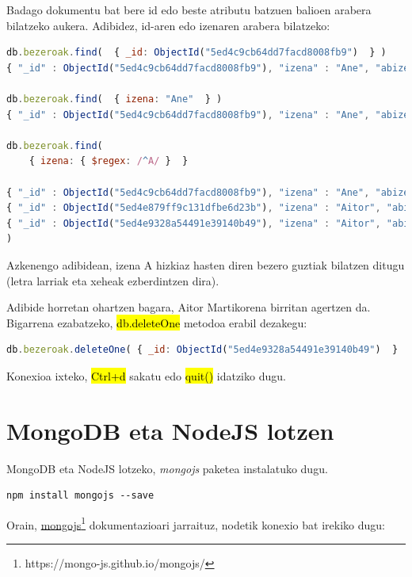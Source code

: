Badago dokumentu bat bere id edo beste atributu batzuen balioen arabera bilatzeko aukera. Adibidez, id-aren edo izenaren arabera bilatzeko:

\begin{lstlisting}[language=JavaScript, numbers=none]
db.bezeroak.find(  { _id: ObjectId("5ed4c9cb64dd7facd8008fb9")  } )
{ "_id" : ObjectId("5ed4c9cb64dd7facd8008fb9"), "izena" : "Ane", "abizena" : "Uriarte", "email" : "ane@ni.eus" }

db.bezeroak.find(  { izena: "Ane"  } )
{ "_id" : ObjectId("5ed4c9cb64dd7facd8008fb9"), "izena" : "Ane", "abizena" : "Uriarte", "email" : "ane@ni.eus" }

db.bezeroak.find(  
    { izena: { $regex: /^A/ }  } 
    
{ "_id" : ObjectId("5ed4c9cb64dd7facd8008fb9"), "izena" : "Ane", "abizena" : "Uriarte", "email" : "ane@ni.eus" }
{ "_id" : ObjectId("5ed4e879ff9c131dfbe6d23b"), "izena" : "Aitor", "abizena" : "Martikorena", "email" : "aitor@ni.eus" }
{ "_id" : ObjectId("5ed4e9328a54491e39140b49"), "izena" : "Aitor", "abizena" : "Martikorena", "email" : "aitor@ni.eus" }
)
\end{lstlisting}

Azkenengo adibidean, izena A hizkiaz hasten diren bezero guztiak bilatzen ditugu (letra larriak eta xeheak ezberdintzen dira).

Adibide horretan ohartzen bagara, Aitor Martikorena birritan agertzen da. Bigarrena ezabatzeko, \hl{db.deleteOne} metodoa erabil dezakegu: 

\begin{lstlisting}[language=JavaScript, numbers=none]
db.bezeroak.deleteOne( { _id: ObjectId("5ed4e9328a54491e39140b49")  }  )
\end{lstlisting}

Konexioa ixteko, \hl{Ctrl+d} sakatu edo \hl{quit()} idatziko dugu.

\section{MongoDB eta NodeJS lotzen}
MongoDB eta NodeJS lotzeko, \textit{mongojs} paketea instalatuko dugu.

\begin{lstlisting}[numbers=none]
npm install mongojs --save     
\end{lstlisting}

Orain, \href{https://mongo-js.github.io/mongojs/}{mongojs}\footnote{https://mongo-js.github.io/mongojs/} dokumentazioari jarraituz, nodetik konexio bat irekiko dugu:

